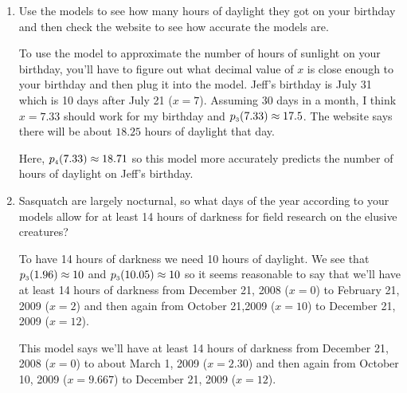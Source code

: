 \documentclass{ximera}
\begin{document}
\begin{problem}
\begin{enumerate}
\item Use the models to see how many hours of daylight they got on your birthday and then check the website to see how accurate the models are.  

\begin{solution}
    To use the model to approximate the number of hours of sunlight on your birthday, you'll have to figure out what decimal value of $x$ is close enough to your birthday and then plug it into the model.  Jeff's birthday is July 31 which is 10 days after July 21 ($x = 7$).  Assuming 30 days in a month, I think $x = 7.33$ should work for my birthday and $p_{\mbox{\tiny $3$}}(7.33) \approx 17.5$.  The website says there will be about $18.25$ hours of daylight that day.
\end{solution}

\begin{solution}
    Here, $p_{\mbox{\tiny $4$}}(7.33) \approx 18.71$ so this model more accurately predicts the number of hours of daylight on Jeff's birthday.
\end{solution}

\item Sasquatch are largely nocturnal, so what days of the year according to your models  allow for at least 14 hours of darkness for field research on the elusive creatures? 

\begin{solution}
    To have 14 hours of darkness we need 10 hours of daylight.  We see that $p_{\mbox{\tiny $3$}}(1.96) \approx 10$ and $p_{\mbox{\tiny $3$}}(10.05) \approx 10$ so it seems reasonable to say that we'll have at least 14 hours of darkness from December 21, 2008 ($x = 0$) to February 21, 2009 ($x = 2$) and then again from October 21,2009 ($x = 10$) to December 21, 2009 ($x = 12$).
\end{solution}

\begin{solution}
    This model says we'll have at least 14 hours of darkness from December 21, 2008 ($x = 0$) to about March 1, 2009 ($x = 2.30$) and then again from October 10, 2009 ($x = 9.667$) to December 21, 2009 ($x = 12$).
\end{solution}


\end{enumerate}
\end{problem}
\end{document}
